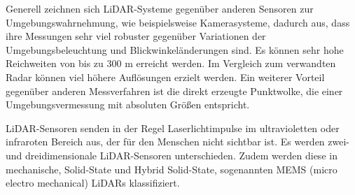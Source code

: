 
Generell zeichnen sich LiDAR-Systeme gegenüber anderen Sensoren zur Umgebungswahrnehmung, wie beispielsweise Kamerasysteme, dadurch aus, dass ihre Messungen sehr viel robuster gegenüber Variationen der Umgebungsbeleuchtung und Blickwinkeländerungen sind. %
Es können sehr hohe Reichweiten von bis zu 300 m er\-reicht werden. Im Vergleich zum verwandten Radar können viel höhere Auflösungen erzielt werden. Ein weiterer Vorteil gegenüber anderen Messverfahren ist die direkt erzeugte Punktwolke, die einer Umgebungsvermessung mit absoluten Größen entspricht. 

LiDAR-Sensoren senden in der Regel Laserlichtimpulse im ultravioletten oder infraroten Bereich aus, der für den Menschen nicht sichtbar ist. Es werden zwei- und dreidimensionale LiDAR-Sensoren unterschieden. Zudem werden diese in me\-cha\-nische, Solid-State und Hybrid Solid-State, sogenannten MEMS (micro electro mechanical) \linebreak LiDARs klassifiziert.


